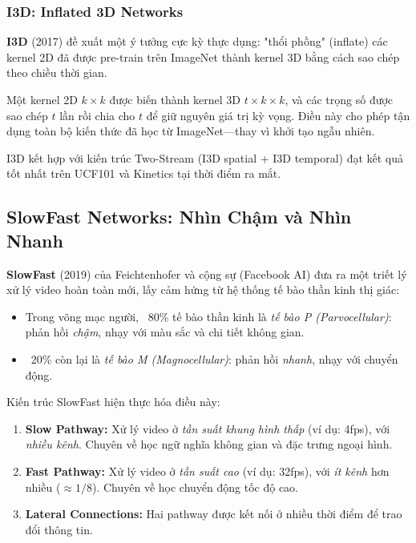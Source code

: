 \subsubsection{I3D: Inflated 3D Networks}
\label{subsubsec:i3d}

\textbf{I3D} \cite{Carreira2017} (2017) đề xuất một ý tưởng cực kỳ thực dụng: "thổi phồng" (inflate) các kernel 2D đã được pre-train trên ImageNet thành kernel 3D bằng cách sao chép theo chiều thời gian.

Một kernel 2D $k \times k$ được biến thành kernel 3D $t \times k \times k$, và các trọng số được sao chép $t$ lần rồi chia cho $t$ để giữ nguyên giá trị kỳ vọng. Điều này cho phép tận dụng toàn bộ kiến thức đã học từ ImageNet—thay vì khởi tạo ngẫu nhiên.

I3D kết hợp với kiến trúc Two-Stream (I3D spatial + I3D temporal) đạt kết quả tốt nhất trên UCF101 và Kinetics tại thời điểm ra mắt.

\subsection{SlowFast Networks: Nhìn Chậm và Nhìn Nhanh}
\label{subsec:slowfast}

\textbf{SlowFast} \cite{Feichtenhofer2019} (2019) của Feichtenhofer và cộng sự (Facebook AI) đưa ra một triết lý xử lý video hoàn toàn mới, lấy cảm hứng từ hệ thống tế bào thần kinh thị giác:

\begin{itemize}
    \item Trong võng mạc người, ~80\% tế bào thần kinh là \textit{tế bào P (Parvocellular)}: phản hồi \textit{chậm}, nhạy với màu sắc và chi tiết không gian.
    \item ~20\% còn lại là \textit{tế bào M (Magnocellular)}: phản hồi \textit{nhanh}, nhạy với chuyển động.
\end{itemize}

Kiến trúc SlowFast hiện thực hóa điều này:

\begin{enumerate}
    \item \textbf{Slow Pathway:} Xử lý video ở \textit{tần suất khung hình thấp} (ví dụ: 4fps), với \textit{nhiều kênh}. Chuyên về học ngữ nghĩa không gian và đặc trưng ngoại hình.
    \item \textbf{Fast Pathway:} Xử lý video ở \textit{tần suất cao} (ví dụ: 32fps), với \textit{ít kênh} hơn nhiều ($\approx 1/8$). Chuyên về học chuyển động tốc độ cao.
    \item \textbf{Lateral Connections:} Hai pathway được kết nối ở nhiều thời điểm để trao đổi thông tin.
\end{enumerate}

